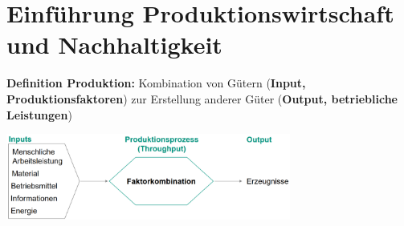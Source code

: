\section{Einführung Produktionswirtschaft und Nachhaltigkeit}

\textbf{Definition Produktion:} Kombination von Gütern (\textbf{Input, Produktionsfaktoren}) zur Erstellung anderer Güter (\textbf{Output, betriebliche Leistungen})
\begin{center}
	\includegraphics[width=0.7\textwidth]{images/prod-def.png}
\end{center}

